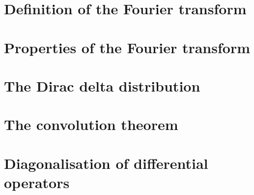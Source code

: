 \section{Definition of the Fourier transform}
\section{Properties of the Fourier transform}
\section{The Dirac delta distribution}
\section{The convolution theorem}
\section{Diagonalisation of differential operators}